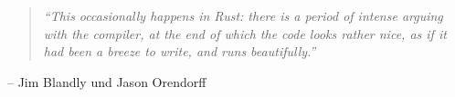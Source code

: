 
\thispagestyle{empty}

\vspace*{\fill}

%
%

\chapter*{}
\begin{center}
	\begin{minipage}{.75\textwidth}
		\begin{quotation}
			\textit{\enquote{This occasionally happens in Rust: there is a period of intense arguing with the compiler, at the end of which the code looks rather nice, as if it had been a breeze to write, and runs beautifully.}}
		\end{quotation}
		\hfill \small{-- \textsf{Jim Blandly und Jason Orendorff \cite[262]{rust:orly_programming}}}
	\end{minipage}
\end{center}

\vspace*{\fill}